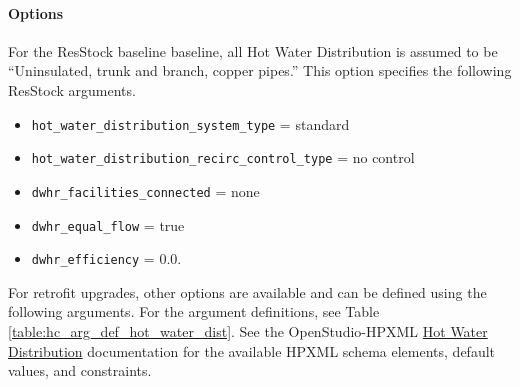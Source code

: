 \paragraph{Options}

For the ResStock baseline baseline, all Hot Water Distribution is assumed to be ``Uninsulated, trunk and branch, copper pipes.'' This option specifies the following ResStock arguments.
\begin{itemize}
    \item \texttt{hot\_water\_distribution\_system\_type} = standard
    \item \texttt{hot\_water\_distribution\_recirc\_control\_type} = no control
    \item \texttt{dwhr\_facilities\_connected} = none
    \item \texttt{dwhr\_equal\_flow} = true
    \item \texttt{dwhr\_efficiency} = 0.0.
\end{itemize}

For retrofit upgrades, other options are available and can be defined using the following arguments. For the argument definitions, see Table \ref{table:hc_arg_def_hot_water_dist}. See the OpenStudio-HPXML \href{https://openstudio-hpxml.readthedocs.io/en/v1.8.1/workflow_inputs.html#hpxml-hot-water-distribution}{Hot Water Distribution} documentation for the available HPXML schema elements, default values, and constraints.


